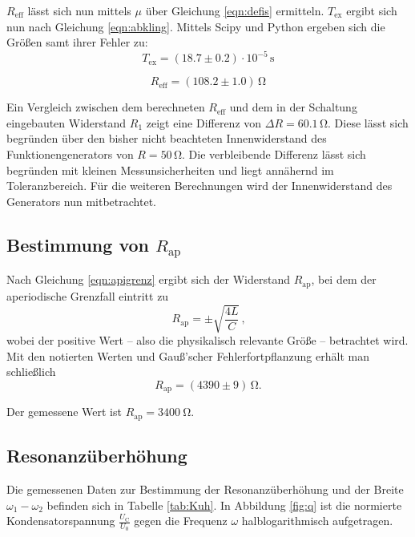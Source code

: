 $R_\text{eff}$ lässt sich nun mittels $\mu$ über Gleichung \eqref{eqn:defis} ermitteln. $T_\text{ex}$ ergibt sich nun nach Gleichung \eqref{eqn:abkling}.
Mittels Scipy und Python ergeben sich die Größen samt ihrer Fehler zu:
\begin{equation*}
	T_{\text{ex}}=(18.7 \pm 0.2) \cdot 10^{-5}\,\si{\second}
\end{equation*}

\begin{equation*}
	R_{\text{eff}}= (108.2 \pm 1.0) \,\si{\ohm}
\end{equation*}

Ein Vergleich zwischen dem berechneten $R_\text{eff}$ und dem in der Schaltung eingebauten Widerstand $R_\text{1}$ zeigt eine Differenz von $\Delta R=60.1 \,\si{\ohm}$.
Diese lässt sich begründen über den bisher nicht beachteten Innenwiderstand des Funktionengenerators von $R=50\,\si{\ohm}$. Die verbleibende Differenz lässt sich begründen mit kleinen Messunsicherheiten und liegt annähernd im Toleranzbereich.
Für die weiteren Berechnungen wird der Innenwiderstand des Generators nun mitbetrachtet.

\subsection{Bestimmung von $R_{\text{ap}}$}

Nach Gleichung \eqref{eqn:apigrenz} ergibt sich der Widerstand $R_{\text{ap}}$, bei dem der
aperiodische Grenzfall eintritt zu
\begin{equation}
	R_{\text{ap}} = \pm \sqrt{\frac{4L}{C}} \, \text{,}
	\label{eqn:rap}
\end{equation}
wobei der positive Wert -- also die physikalisch relevante Größe -- betrachtet wird.
Mit den notierten Werten und Gauß'scher Fehlerfortpflanzung erhält man schließlich
\begin{equation*}
	R_{\text{ap}} = (4390 \pm 9) \, \si{\ohm} \text{.}
\end{equation*}

Der gemessene Wert ist $R_{\text{ap}} = \SI{3400}{\ohm}$.
\subsection{Resonanzüberhöhung}
Die gemessenen Daten zur Bestimmung der Resonanzüberhöhung und der Breite $ \omega_1 - \omega_2 $ befinden sich in Tabelle \ref{tab:Kuh}.
In Abbildung \ref{fig:q} ist die normierte Kondensatorspannung $\frac{U_{\mathrm{C}}}{U_{\mathrm{0}}}$ gegen die Frequenz $\omega$ halblogarithmisch aufgetragen.

